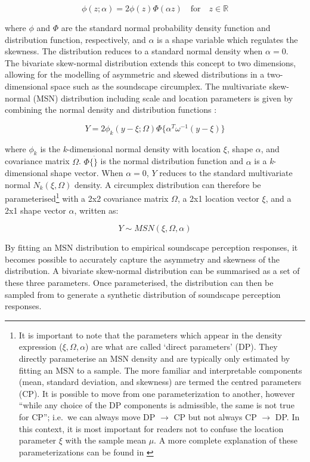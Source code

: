 \documentclass[
  authoryear,
  preprint,
  3p]{elsarticle}
\begin{document}
\[
\phi(z; \alpha) = 2 \phi(z) \Phi(\alpha z) \quad \text{for} \quad z \in \mathbb{R}
\]

where \(\phi\) and \(\Phi\) are the standard normal probability density
function and distribution function, respectively, and \(\alpha\) is a
shape variable which regulates the skewness. The distribution reduces to
a standard normal density when \(\alpha = 0\). The bivariate skew-normal
distribution extends this concept to two dimensions, allowing for the
modelling of asymmetric and skewed distributions in a two-dimensional
space such as the soundscape circumplex. The multivariate skew-normal
(MSN) distribution including scale and location parameters is given by
combining the normal density and distribution functions
\citep{Azzalini1999Statistical}:

\[
Y = 2 \phi_k (y-\xi; \Omega) \Phi\{\alpha^T\omega^{-1}(y-\xi)\} 
\]

where \(\phi_k\) is the \emph{k}-dimensional normal density with
location \(\xi\), shape \(\alpha\), and covariance matrix \(\Omega\).
\(\Phi \{ \dot \}\) is the normal distribution function and \(\alpha\)
is a \emph{k}-dimensional shape vector. When \(\alpha = 0\), \(Y\)
reduces to the standard multivariate normal \(N_k(\xi, \Omega)\)
density. A circumplex distribution can therefore be
parameterised\footnote{It is important to note that the parameters which
  appear in the density expression (\(\xi, \Omega, \alpha\)) are what
  are called `direct parameters' (DP). They directly parameterise an MSN
  density and are typically only estimated by fitting an MSN to a
  sample. The more familiar and interpretable components (mean, standard
  deviation, and skewness) are termed the centred parameters (CP). It is
  possible to move from one parameterization to another, however ``while
  any choice of the DP components is admissible, the same is not true
  for CP''; i.e.~we can always move DP \(\rightarrow\) CP but not always
  CP \(\rightarrow\) DP. In this context, it is most important for
  readers not to confuse the location parameter \(\xi\) with the sample
  mean \(\mu\). A more complete explanation of these parameterizations
  can be found in \citet{Azzalini2016How}} with a 2x2 covariance matrix
\(\Omega\), a 2x1 location vector \(\xi\), and a 2x1 shape vector
\(\alpha\), written as:

\[
Y \sim MSN (\xi, \Omega, \alpha)
\]

By fitting an MSN distribution to empirical soundscape perception
responses, it becomes possible to accurately capture the asymmetry and
skewness of the distribution. A bivariate skew-normal distribution can
be summarised as a set of these three parameters. Once parameterised,
the distribution can then be sampled from to generate a synthetic
distribution of soundscape perception responses.
\end{document}
